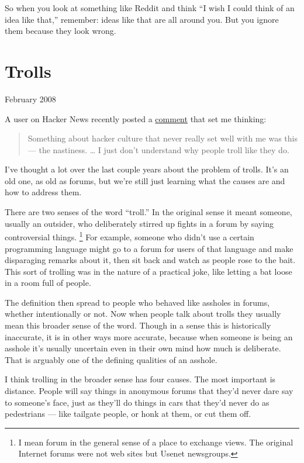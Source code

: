 \documentclass[12pt]{book}
\begin{document}
So when you look at something like Reddit and think ``I wish I could
think of an idea like that,'' remember: ideas like that are all around
you. But you ignore them because they look wrong.
\chapter{Trolls}

February 2008

A user on Hacker News recently posted a
\href{http://news.ycombinator.com/item?id=116938}{comment} that set me
thinking:

\begin{quote}
Something about hacker culture that never really set well with me was
this --- the nastiness. \ldots{} I just don't understand why people
troll like they do.
\end{quote}

I've thought a lot over the last couple years about the problem of
trolls. It's an old one, as old as forums, but we're still just learning
what the causes are and how to address them.

There are two senses of the word ``troll.'' In the original sense it
meant someone, usually an outsider, who deliberately stirred up fights
in a forum by saying controversial things. \footnote{I mean forum in the general sense of a place to exchange views.
The original Internet forums were not web sites but Usenet newsgroups.} For
example, someone who didn't use a certain programming language might go
to a forum for users of that language and make disparaging remarks about
it, then sit back and watch as people rose to the bait. This sort of
trolling was in the nature of a practical joke, like letting a bat loose
in a room full of people.

The definition then spread to people who behaved like assholes in
forums, whether intentionally or not. Now when people talk about trolls
they usually mean this broader sense of the word. Though in a sense this
is historically inaccurate, it is in other ways more accurate, because
when someone is being an asshole it's usually uncertain even in their
own mind how much is deliberate. That is arguably one of the defining
qualities of an asshole.

I think trolling in the broader sense has four causes. The most
important is distance. People will say things in anonymous forums that
they'd never dare say to someone's face, just as they'll do things in
cars that they'd never do as pedestrians --- like tailgate people, or
honk at them, or cut them off.
\end{document}
